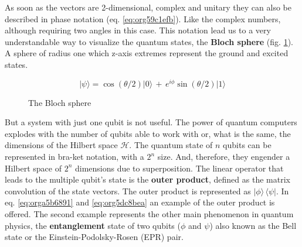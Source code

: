 \begin{itemize}
As soon as the vectors are 2-dimensional, complex and unitary they can also be described in phase notation (eq. \ref{eq:org59c1efb}).
Like the complex numbers, although requiring two angles in this case.
This notation lead us to a very understandable way to visualize the quantum states, the \textbf{Bloch sphere} (fig. \ref{fig:bloch_sphere}).
A sphere of radius one which z-axis extremes represent the ground and excited states.

\begin{equation}
\label{eq:org59c1efb}
|\psi \rangle =\cos \left(\theta /2\right)|0\rangle \,+\,e^{i\phi }\sin \left(\theta /2\right)|1\rangle
\end{equation}

\begin{figure}
\centering
{}
\caption{The Bloch sphere}
\label{fig:bloch_sphere}
\end{figure}

But a system with just one qubit is not useful.
The power of quantum computers explodes with the number of qubits able to work with or, what is the same, the dimensions of the Hilbert space \(\mathscr{H}\).
The quantum state of \(n\) qubits can be represented in bra-ket notation, with a \(2^n\) size.
And, therefore, they engender a Hilbert space of \(2^n\) dimensions due to superposition.
The linear operator that leads to the multiple qubit's state is the \textbf{outer product}, defined as the matrix convolution of the state vectors.
The outer product is represented as \(|\phi \rangle \,\langle \psi |\).
In eq. \ref{eq:orga5b6891} and \ref{eq:org5dc8bea} an example of the outer product is offered.
The second example represents the other main phenomenon in quantum physics, the \textbf{entanglement} state of two qubits (\(\phi\) and \(\psi\)) also known as the Bell state or the Einstein-Podolsky-Rosen (EPR) pair.


\end{itemize}
